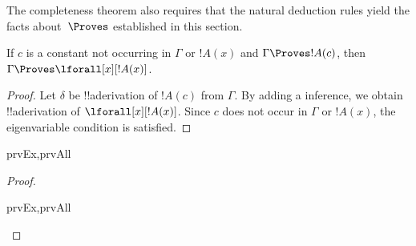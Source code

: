 \documentclass[../../../include/open-logic-section]{subfiles}
\begin{document}

\begin{explain}
  The completeness theorem also requires that the natural deduction
  rules yield the facts about~$\Proves$ established in this section.
\end{explain}

\begin{thm}
 If $c$ is a constant not occurring
in $\Gamma$ or $!A(x)$ and $\Gamma \Proves !A(c)$, then $\Gamma
\Proves \lforall[x][!A(x)]$.
\end{thm}

\begin{proof}
Let $\delta$ be !!a{derivation} of $!A(c)$ from $\Gamma$.  By adding a
\Intro{\lforall} inference, we obtain !!a{derivation} of
$\lforall[x][!A(x)]$. Since $c$ does not occur in $\Gamma$ or $!A(x)$,
the eigenvariable condition is satisfied.
\end{proof}

\begin{prop}
\begin{tagenumerate}{prvEx,prvAll}

\end{tagenumerate}
\end{prop}

\begin{proof}
\begin{tagenumerate}{prvEx,prvAll}

\end{tagenumerate}
\end{proof}
\end{document}
